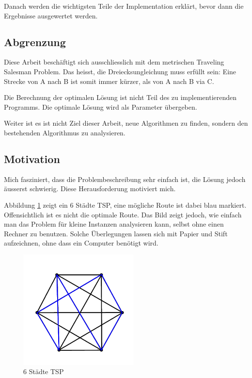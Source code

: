 \documentclass[11pt,a4paper]{article}
\begin{document}
Danach werden die wichtigsten Teile der Implementation erklärt, bevor dann die Ergebnisse ausgewertet werden. 

\subsection{Abgrenzung}
Diese Arbeit beschäftigt sich ausschliesslich mit dem metrischen Traveling Salesman Problem. Das heisst, die Dreiecksungleichung muss erfüllt sein: Eine Strecke von A nach B ist somit immer kürzer, als von A nach B via C. 

Die Berechnung der optimalen Lösung ist nicht Teil des zu implementierenden Programms. Die optimale Lösung wird als Parameter übergeben.

Weiter ist es ist nicht Ziel dieser Arbeit, neue Algorithmen zu finden, sondern den bestehenden Algorithmus zu analysieren.

\subsection{Motivation}
Mich fasziniert, dass die Problembeschreibung sehr einfach ist, die Lösung jedoch äusserst schwierig. Diese Herausforderung motiviert mich.

Abbildung \ref{img:simple_tsp} zeigt ein 6 Städte TSP, eine mögliche Route ist dabei blau markiert. Offensichtlich ist es nicht die optimale Route. Das Bild zeigt jedoch, wie einfach man das Problem für kleine Instanzen analysieren kann, selbst ohne einen Rechner zu benutzen. Solche Überlegungen lassen sich mit Papier und Stift aufzeichnen, ohne dass ein Computer benötigt wird. 

\begin{figure}[H]
        \centering
        \includegraphics[width=6cm]{gfx/simple_tsp}
        \caption{6 Städte TSP}
        \label{img:simple_tsp}
\end{figure}
\end{document}
